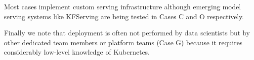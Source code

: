 Most cases implement custom serving infrastructure although emerging model serving systems like KFServing \DIFdelbegin {}\DIFdelend \DIFaddbegin {}\DIFaddend are being tested in Cases C and O respectively. 

Finally we note that deployment is often not performed by data scientists but by other dedicated team members or platform teams (Case G) because it requires considerably low-level knowledge of Kubernetes.





